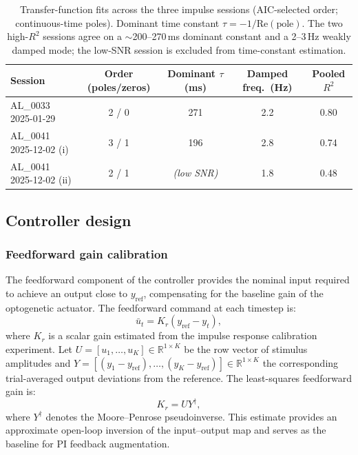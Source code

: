 \begin{table}[h]
    \centering
    \begin{tabular}{lcccc}
        \hline
        Session & Order (poles/zeros) & Dominant $\tau$ (ms) & Damped freq.\ (Hz) & Pooled $R^2$ \\
        \hline
        AL\_0033 2025-01-29       & 2 / 0 & 271          & 2.2 & 0.80 \\
        AL\_0041 2025-12-02 (i)   & 3 / 1 & 196          & 2.8 & 0.74 \\
        AL\_0041 2025-12-02 (ii)  & 2 / 1 & \emph{(low SNR)} & 1.8 & 0.48 \\
        \hline
    \end{tabular}
    \caption{Transfer-function fits across the three impulse sessions
        (AIC-selected order; continuous-time poles). Dominant time constant
        $\tau = -1/\mathrm{Re}(\text{pole})$. The two high-$R^2$ sessions agree
        on a $\sim$200--270\,ms dominant constant and a 2--3\,Hz weakly damped
        mode; the low-SNR session is excluded from time-constant estimation.}
    \label{tab:tf_sessions}
\end{table}

\subsection*{Controller design}

\subsubsection*{Feedforward gain calibration}
\label{sec:ff_gain}

The feedforward component of the controller provides the nominal input
required to achieve an output close to $y_{\mathrm{ref}}$, compensating
for the baseline gain of the optogenetic actuator. The feedforward
command at each timestep is:
%
\begin{equation}
    \bar{u}_{t} = K_{r}(y_{\mathrm{ref}} - y_{t}),
    \label{eq:ff}
\end{equation}
%
where $K_{r}$ is a scalar gain estimated from the impulse response
calibration experiment. Let $U = [u_{1}, \ldots, u_{K}] \in
\mathbb{R}^{1 \times K}$ be the row vector of stimulus amplitudes and
$Y = [(y_{1} - y_{\mathrm{ref}}), \ldots, (y_{K} - y_{\mathrm{ref}})]
\in \mathbb{R}^{1 \times K}$ the corresponding trial-averaged output
deviations from the reference. The least-squares feedforward gain is:
%
\begin{equation}
    K_{r} = U Y^{\dagger},
    \label{eq:kr}
\end{equation}
%
where $Y^{\dagger}$ denotes the Moore--Penrose pseudoinverse. This
estimate provides an approximate open-loop inversion of the
input--output map and serves as the baseline for PI feedback
augmentation.

